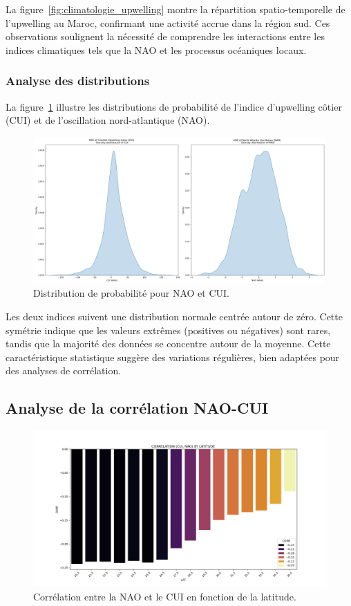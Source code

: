 La figure~\ref{fig:climatologie_upwelling} montre la répartition spatio-temporelle de l'upwelling au Maroc, confirmant une activité accrue dans la région sud. Ces observations soulignent la nécessité de comprendre les interactions entre les indices climatiques tels que la NAO et les processus océaniques locaux.

\subsubsection{Analyse des distributions}
La figure~\ref{fig:distributions} illustre les distributions de probabilité de l’indice d'upwelling côtier (CUI) et de l'oscillation nord-atlantique (NAO). 

\begin{figure}[H]
\centering
\includegraphics[scale=0.3]{kde_nao_cui.png}
\caption{Distribution de probabilité pour NAO et CUI.}
\label{fig:distributions}
\end{figure}

Les deux indices suivent une distribution normale centrée autour de zéro. Cette symétrie indique que les valeurs extrêmes (positives ou négatives) sont rares, tandis que la majorité des données se concentre autour de la moyenne. Cette caractéristique statistique suggère des variations régulières, bien adaptées pour des analyses de corrélation.

\subsection{Analyse de la corrélation NAO-CUI}
\begin{figure}[H]
\centering
\includegraphics[scale=0.3]{corr.png}
\caption{Corrélation entre la NAO et le CUI en fonction de la latitude.}
\label{fig:correlation}
\end{figure}

